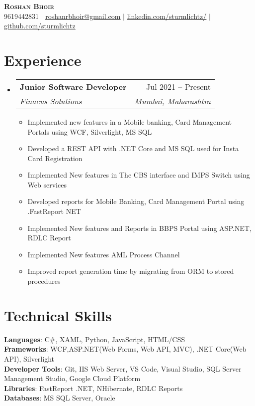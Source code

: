 \documentclass[letterpaper,11pt]{article}
\makeatletter
\newcommand{\resumeItem}[1]{
  \item\small{
    {#1 \vspace{-2pt}}
  }
}
\newcommand{\resumeSubheading}[4]{
  \vspace{-2pt}\item
    \begin{tabular*}{0.97\textwidth}[t]{l@{\extracolsep{\fill}}r}
      \textbf{#1} & #2 \\
      \textit{\small#3} & \textit{\small #4} \\
    \end{tabular*}\vspace{-7pt}
}
\newcommand{\resumeSubHeadingListStart}{\begin{itemize}[leftmargin=0.15in, label={}]}
\newcommand{\resumeSubHeadingListEnd}{\end{itemize}}
\newcommand{\resumeItemListStart}{\begin{itemize}}
\newcommand{\resumeItemListEnd}{\end{itemize}\vspace{-5pt}}
\makeatother
\begin{document}
\begin{center}
    \textbf{\Huge \scshape Roshan Bhoir} \\ \vspace{1pt}
    \small 9619442831 $|$ \href{mailto:roshanrbhoir@gmail.com}{\underline{roshanrbhoir@gmail.com}} $|$ 
    \href{https://linkedin.com/in/sturmlichtz}{\underline{linkedin.com/sturmlichtz/}} $|$
    \href{https://github.com/sturmlichtz}{\underline{github.com/sturmlichtz}}
\end{center}
\section{Experience}
  \resumeSubHeadingListStart
    \resumeSubheading
      {Junior Software Developer}{Jul 2021 -- Present}
      {Finacus Solutions}{Mumbai, Maharashtra}
      \resumeItemListStart
        \resumeItem{Implemented new features in a Mobile banking, Card Management Portals using WCF, Silverlight, MS SQL }
        \resumeItem{Developed a REST API with .NET Core and MS SQL used for Insta Card Registration}
        \resumeItem{Implemented New features in The CBS interface and IMPS Switch using Web services }
        \resumeItem{Developed reports for Mobile Banking, Card Management Portal using .FastReport NET}
        \resumeItem{Implemented New features and Reports in BBPS Portal using ASP.NET, RDLC Report}
        \resumeItem{Implemented New features AML Process Channel}
        \resumeItem{Improved report generation time by migrating from ORM to stored procedures}
      \resumeItemListEnd
  \resumeSubHeadingListEnd

\section{Technical Skills}
\begin{itemize}[leftmargin=0.15in, label={}]
    \small{\item{
     \textbf{Languages}{: C\#, XAML, Python, JavaScript, HTML/CSS} \\
     \textbf{Frameworks}{: WCF,ASP.NET(Web Forms, Web API, MVC), .NET Core(Web API), Silverlight} \\
     \textbf{Developer Tools}{: Git, IIS Web Server, VS Code, Visual Studio, SQL Server Management Studio, Google Cloud Platform} \\
     \textbf{Libraries}{: FastReport .NET, NHibernate, RDLC Reports}\\
     \textbf{Databases}{: MS SQL Server, Oracle} \\
    }}
 \end{itemize}
\end{document}

